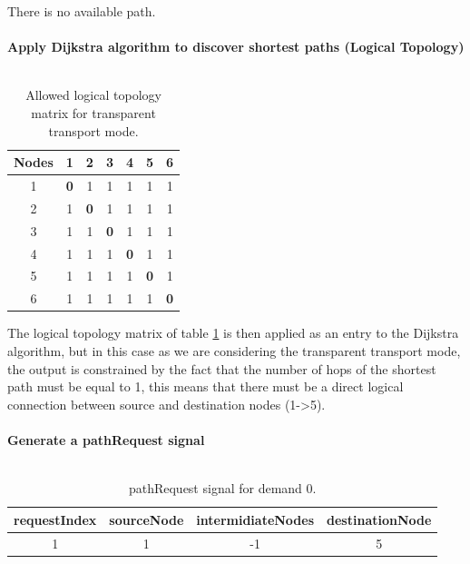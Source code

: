 There is no available path.\\ \\

\textbf{Apply Dijkstra algorithm to discover shortest paths (Logical Topology)}\\ \\
\begin{table}[H]
	\centering	
	\begin{tabular}{|c|c|c|c|c|c|c|}
		\hline
		\multicolumn{1}{|l|}{\textbf{Nodes}} & 1   & 2   & 3   & 4   & 5   & 6  \\ \hline
		1                           & \textbf{0}   & 1 & 1 & 1 & 1 & 1 \\ \hline
		2                           & 1 & \textbf{0}   & 1 & 1 & 1 & 1 \\ \hline
		3                           & 1 & 1 & \textbf{0}   & 1 & 1 & 1 \\ \hline
		4                           & 1 & 1 & 1 & \textbf{0}   & 1 & 1 \\ \hline
		5                           & 1 & 1 & 1 & 1 & \textbf{0}   & 1 \\ \hline
		6                           & 1 & 1 & 1 & 1 & 1 & \textbf{0}   \\ \hline
	\end{tabular}
	\caption{Allowed logical topology matrix for transparent transport mode.}
	\label{Transparentlogical_topology}
\end{table}

The logical topology matrix of table \ref{Transparentlogical_topology} is then applied as an entry to the Dijkstra algorithm, but in this case as we are considering the transparent transport mode, the output is constrained by the fact that the number of hops of the shortest path must be equal to 1, this means that there must be a direct logical connection between source and destination nodes (1->5).\\ \\

\textbf{Generate a pathRequest signal}\\ \\

\begin{table}[H]
	\centering
	\begin{tabular}{|c|c|c|c|}
		\hline
		requestIndex & sourceNode & intermidiateNodes & destinationNode \\ \hline
		1            & 1          & -1                 & 5               \\ \hline
	\end{tabular}
	\caption{pathRequest signal for demand 0.}
\end{table} 

